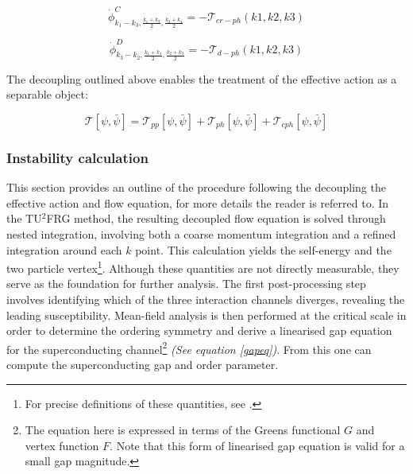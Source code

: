 \documentclass[11pt]{article}
\begin{document}
\begin{equation}\label{con2}
    \dot{\phi}^{C}_{k_1 - k_3, \frac{k_1 +k_3}{2}, \frac{k_2+k_4}{2}} = - \mathcal{T}_{cr-ph}(k1,k2,k3)
\end{equation}

\begin{equation}\label{con}
    \dot{\phi}^{D}_{k_3- k_2, \frac{k_1 + k_4}{2}, \frac{k_2+k_3}{2}} = - \mathcal{T}_{d-ph}(k1,k2,k3)
\end{equation}

\noindent The decoupling outlined above enables the treatment of the effective action as a separable object:

\begin{equation}
    \mathcal{T}[\psi, \bar{\psi}] = \mathcal{T}_{pp}[\psi, \bar{\psi}] + \mathcal{T}_{ph}[\psi, \bar{\psi}] + \mathcal{T}_{cph}[\psi, \bar{\psi}]
\end{equation}

\medskip





\subsubsection{Instability calculation}

This section provides an outline of the procedure following the decoupling the effective action and flow equation, for more details the reader is referred to\cite{profe2023functional}. 
In the TU$^2$FRG method, the resulting decoupled flow equation is solved through nested integration, involving both a coarse momentum integration and a
refined integration around each $k$ point.  This calculation yields the self-energy and the two particle vertex\footnote{For precise definitions of these quantities, see \cite{metzner2012functional}.}.
Although these quantities are not directly measurable, they serve as the foundation for further analysis. The first post-processing step involves
identifying which of the three interaction channels diverges, revealing the leading susceptibility. Mean-field analysis\cite{reiss2007renormalized} is then performed at the critical scale in order to determine the ordering symmetry 
and derive a linearised gap equation for the superconducting channel\footnote{The equation here is expressed in terms of the Greens functional $G$ and vertex function $F$. Note that this form of linearised gap equation is valid for a small gap magnitude. }
\textit{(See equation \ref{gapeq})}\cite{profe2023functional}. From this one can compute 
the superconducting gap and order parameter.
\end{document}
